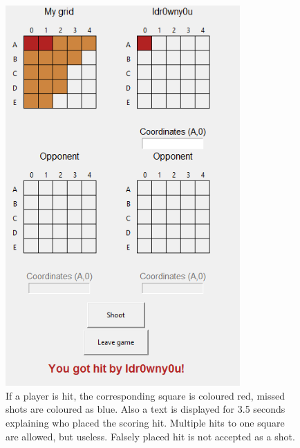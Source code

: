 \documentclass[]{article}
\begin{document}
\begin{figure}[!hbt]
	\centering
	\includegraphics[width=0.8\textwidth]{GotHit.png}
	\caption{If a player is hit, the corresponding square is coloured red, missed shots are coloured as blue. Also a text is displayed for 3.5 seconds explaining who placed the scoring hit. Multiple hits to one square are allowed, but useless. Falsely placed hit is not accepted as a shot.}
	\label{fig:Gothit}
\end{figure}
\end{document}

